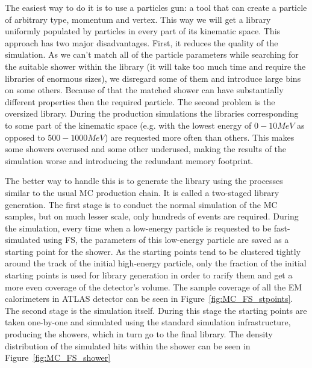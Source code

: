 The easiest way to do it is to use a particles gun: a tool that can create a particle of arbitrary type, momentum and vertex. This way we will get a library uniformly populated by particles in every part of its kinematic space. This approach has two major disadvantages. First, it reduces the quality of the simulation. As we can't match all of the particle parameters while searching for the suitable shower within the library (it will take too much time and require the libraries of enormous sizes), we disregard some of them and introduce large bins on some others. Because of that the matched shower can have substantially different properties then the required particle. The second problem is the oversized library. During the production simulations the libraries corresponding to some part of the kinematic space (e.g. with the lowest energy of $0-10 MeV$ as opposed to $500-1000 MeV$) are requested more often than others. This makes some showers overused and some other underused, making the results of the simulation worse and introducing the redundant memory footprint.

The better way to handle this is to generate the library using the processes similar to the usual MC production chain. It is called a two-staged library generation. The first stage is to conduct the normal simulation of the MC samples, but on much lesser scale, only hundreds of events are required. During the simulation, every time when a low-energy particle is requested to be fast-simulated using FS, the parameters of this low-energy particle are saved as a starting point for the shower. As the starting points tend to be clustered tightly around the track of the initial high-energy particle, only the fraction of the initial starting points is used for library generation in order to rarify them and get a more even coverage of the detector's volume. The sample coverage of all the EM calorimeters in ATLAS detector can be seen in Figure~\ref{fig:MC_FS_stpoints}. The second stage is the simulation itself. During this stage the starting points are taken one-by-one and simulated using the standard simulation infrastructure, producing the showers, which in turn go to the final library. The density distribution of the simulated hits within the shower can be seen in Figure~\ref{fig:MC_FS_shower}

